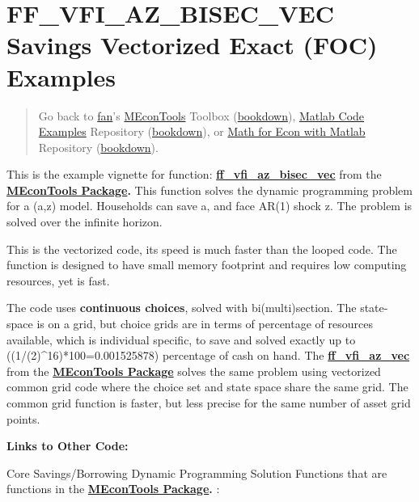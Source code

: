 \documentclass[
]{book}
\begin{document}
\hypertarget{ff_vfi_az_bisec_vec-savings-vectorized-exact-foc-examples}{%
\section{FF\_VFI\_AZ\_BISEC\_VEC Savings Vectorized Exact (FOC) Examples}\label{ff_vfi_az_bisec_vec-savings-vectorized-exact-foc-examples}}

\begin{quote}
Go back to \href{http://fanwangecon.github.io/}{fan}'s \href{https://fanwangecon.github.io/MEconTools/}{MEconTools} Toolbox (\href{https://fanwangecon.github.io/MEconTools/bookdown}{bookdown}), \href{https://fanwangecon.github.io/M4Econ/}{Matlab Code Examples} Repository (\href{https://fanwangecon.github.io/M4Econ/bookdown}{bookdown}), or \href{https://fanwangecon.github.io/Math4Econ/}{Math for Econ with Matlab} Repository (\href{https://fanwangecon.github.io/Math4Econ/bookdown}{bookdown}).
\end{quote}

This is the example vignette for function:
\href{https://github.com/FanWangEcon/MEconTools/blob/master/MEconTools/vfi/ff_vfi_az_bisec_vec.m}{\textbf{ff\_vfi\_az\_bisec\_vec}}
from the \href{https://fanwangecon.github.io/MEconTools/}{\textbf{MEconTools
Package}}\textbf{.} This function
solves the dynamic programming problem for a (a,z) model. Households can
save a, and face AR(1) shock z. The problem is solved over the infinite
horizon.

This is the vectorized code, its speed is much faster than the looped
code. The function is designed to have small memory footprint and
requires low computing resources, yet is fast.

The code uses \textbf{continuous choices}, solved with bi(multi)section. The
state-space is on a grid, but choice grids are in terms of percentage of
resources available, which is individual specific, to save and solved
exactly up to ((1/(2)\^{}16)*100=0.001525878) percentage of cash on hand.
The
\href{https://github.com/FanWangEcon/MEconTools/blob/master/MEconTools/vfi/ff_vfi_az_vec.m}{\textbf{ff\_vfi\_az\_vec}}
from the \href{https://fanwangecon.github.io/MEconTools/}{\textbf{MEconTools
Package}} solves the same
problem using vectorized common grid code where the choice set and state
space share the same grid. The common grid function is faster, but less
precise for the same number of asset grid points.

\textbf{Links to Other Code:}

Core Savings/Borrowing Dynamic Programming Solution Functions that are
functions in the \href{https://fanwangecon.github.io/MEconTools/}{\textbf{MEconTools
Package}}\textbf{.} :
\end{document}
